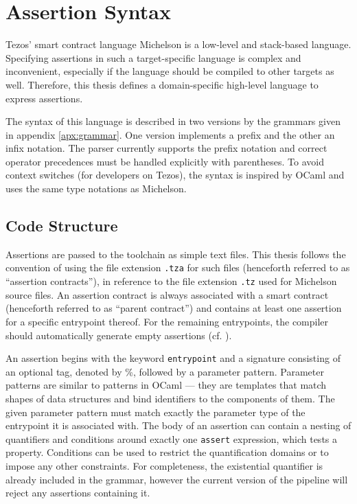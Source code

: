 \section{Assertion Syntax}\label{sec:syntax}
Tezos' smart contract language Michelson is a low-level and stack-based language. Specifying assertions in such a target-specific language is complex and inconvenient, especially if the language should be compiled to other targets as well. Therefore, this thesis defines a domain-specific high-level language to express assertions. 

The syntax of this language is described in two versions by the grammars given in appendix \ref{apx:grammar}. One version implements a prefix and the other an infix notation. The parser currently supports the prefix notation and correct operator precedences must be handled explicitly with parentheses. To avoid context switches (for developers on Tezos), the syntax is inspired by OCaml and uses the same type notations as Michelson.

\subsection{Code Structure}
Assertions are passed to the toolchain as simple text files. This thesis follows the convention of using the file extension \texttt{.tza} for such files (henceforth referred to as ``assertion contracts''), in reference to the file extension \texttt{.tz} used for Michelson source files. An assertion contract is always associated with a smart contract (henceforth referred to as ``parent contract'') and contains at least one assertion for a specific entrypoint thereof. For the remaining entrypoints, the compiler should automatically generate empty assertions (cf. ).

An assertion begins with the keyword \texttt{entrypoint} and a signature consisting of an optional tag, denoted by \%, followed by a parameter pattern. Parameter patterns are similar to patterns in OCaml --- they are templates that match shapes of data structures and bind identifiers to the components of them. The given parameter pattern must match exactly the parameter type of the entrypoint it is associated with. The body of an assertion can contain a nesting of quantifiers and conditions around exactly one \texttt{assert} expression, which tests a property. Conditions can be used to restrict the quantification domains or to impose any other constraints. For completeness, the existential quantifier is already included in the grammar, however the current version of the pipeline will reject any assertions containing it. 

